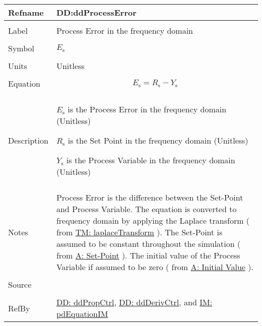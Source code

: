 \documentclass[12pt]{article}
\begin{document}
\vspace{\baselineskip}
\noindent
\begin{minipage}{\textwidth}
\begin{tabular}{>{\raggedright}p{}>{\raggedright\arraybackslash}p{}}
\toprule \textbf{Refname} & \textbf{DD:ddProcessError}
\label{DD:ddProcessError}
\\ \midrule \\
Label & Process Error in the frequency domain
        
\\ \midrule \\
Symbol & ${E_{\text{s}}}$
         
\\ \midrule \\
Units & Unitless
        
\\ \midrule \\
Equation & \begin{displaymath}
           {E_{\text{s}}}={R_{\text{s}}}-{Y_{\text{s}}}
           \end{displaymath}
\\ \midrule \\
Description & \begin{symbDescription}
              \item{${E_{\text{s}}}$ is the Process Error in the frequency domain (Unitless)}
              \item{${R_{\text{s}}}$ is the Set Point in the frequency domain (Unitless)}
              \item{${Y_{\text{s}}}$ is the Process Variable in the frequency domain (Unitless)}
              \end{symbDescription}
\\ \midrule \\
Notes & Process Error is the difference between the Set-Point and  Process Variable. The equation is converted to frequency domain by applying the Laplace transform ( from \hyperref[TM:laplaceTransform]{TM: laplaceTransform} ). The Set-Point is assumed to be constant throughout the simulation ( from  \hyperref[setPoint]{A: Set-Point} ). The initial value of the Process Variable if assumed to be zero ( from  \hyperref[initialValue]{A: Initial Value} ).
        
\\ \midrule \\
Source & \cite{johnson2008}
         
\\ \midrule \\
RefBy & \hyperref[DD:ddPropCtrl]{DD: ddPropCtrl}, \hyperref[DD:ddDerivCtrl]{DD: ddDerivCtrl}, and \hyperref[IM:pdEquationIM]{IM: pdEquationIM}
        
\\ \bottomrule
\end{tabular}
\end{minipage}
\end{document}
